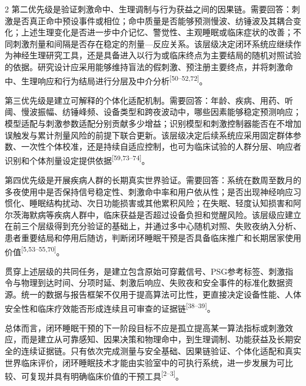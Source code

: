 \documentclass[UTF8,zihao=5,fontset=none]{ctexart}
\newcommand{\hei}{\CJKfamily{hei}}
\newcommand{\leveltwo}[1]{%
  \par\noindent{\hei\fontsize{10.5pt}{15.6pt}\selectfont\bfseries #1\par}}
\newcommand{\refcite}[1]{\nolinebreak[4]\textsuperscript{[#1]}}
\begin{document}
\begin{multicols}{2}
第二优先级是验证刺激命中、生理调制与行为获益之间的因果链。需要回答：刺激是否真正命中预设事件或相位；命中质量是否能够预测慢波、纺锤波及其耦合变化；上述生理变化是否进一步中介记忆、警觉性、主观睡眠或临床症状的改善；不同刺激剂量和间隔是否存在稳定的剂量—反应关系。该层级决定闭环系统应继续作为神经生理研究工具，还是具备进入以行为或临床终点为主要结局的随机对照试验的依据。研究设计应采用能够维持盲法的假刺激、预注册主要终点，并将刺激命中、生理响应和行为结局进行分层及中介分析\refcite{50--52,72}。\par

第三优先级是建立可解释的个体化适配机制。需要回答：年龄、疾病、用药、听阈、慢波振幅、纺锤峰频、设备类型和跨夜波动中，哪些因素能够稳定预测响应；模型适配与刺激参数适配分别贡献多少增益；识别模型和刺激控制器能否在不增加误触发与累计剂量风险的前提下联合更新。该层级决定后续系统应采用固定群体参数、一次性个体校准，还是持续自适应控制，也可为临床试验的人群分层、响应者识别和个体剂量设定提供依据\refcite{59,73--74}。\par

第四优先级是开展疾病人群的长期真实世界验证。需要回答：系统在数周至数月的多夜使用中是否保持信号稳定性、刺激命中率和用户依从性；是否出现神经响应习惯化、睡眠结构扰动、次日功能损害或其他累积风险；在失眠、轻度认知损害和阿尔茨海默病等疾病人群中，临床获益是否超过设备负担和觉醒风险。该层级应建立在前三个层级得到充分验证的基础上，并通过多中心随机对照、失败夜纳入分析、患者重要结局和停用后随访，判断闭环睡眠干预是否具备临床推广和长期居家使用价值\refcite{5,53--55,70}。\par

贯穿上述层级的共同任务，是建立包含原始可穿戴信号、PSG参考标签、刺激指令与物理到达时间、分项时延、刺激后响应、失败夜和安全事件的标准化数据资源。统一的数据与报告框架不仅用于提高算法可比性，更直接决定设备性能、人体安全性和临床疗效能否形成连续且可审查的证据链\refcite{38--39}。\par

\leveltwo{7.3 总结}

总体而言，闭环睡眠干预的下一阶段目标不应是孤立提高某一算法指标或刺激效应，而是建立从可靠感知、因果决策和物理命中，到生理调制、功能获益及长期安全的连续证据链。只有依次完成测量与安全基础、因果链验证、个体化适配和真实世界临床评价，闭环睡眠技术才能由实验室中的可执行系统，进一步发展为可比较、可复现并具有明确临床价值的干预工具\refcite{2--3}。\par



\end{multicols}
\end{document}
